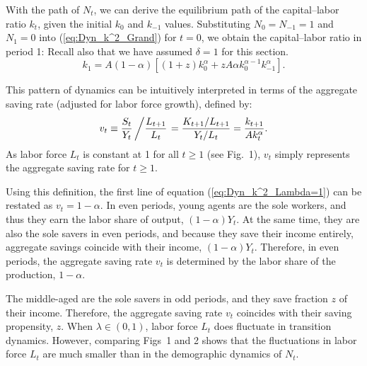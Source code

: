 \documentclass{MBE}%
\begin{document}
{With the path of $N_{t}$, we can derive the equilibrium path of the capital--labor ratio $k_{t}$,
given the initial $k_{0}$ and $k_{-1}$ values. Substituting $N_{0}=N_{-1}=1$ and $N_{1}=0$ into
(\ref{eq:Dyn_k^2_Grand}) for $t=0$, we obtain the capital--labor ratio in period 1: {Recall also
that we have assumed $\delta=1$ for this section.}
\begin{equation}
k_{1}=A(1-\alpha)\left[  (1+z)k_{0}^{\alpha}+zA\alpha k_{0}^{\alpha-1}%
k_{-1}^{\alpha}\right]  . \label{eq:Dyn_k^2_Period1}%
\end{equation}


This pattern of dynamics can be intuitively interpreted in terms of the
aggregate saving rate (adjusted for labor force growth), defined by:
\begin{equation}
v_{t}\equiv\frac{S_{t}}{Y_{t}}\left/  \frac{L_{t+1}}{L_{t}}\right.  =
\frac{K_{t+1}/L_{t+1}}{Y_{t}/L_{t}} =\frac{k_{t+1}}{A k_{t}^{\alpha}}.
\label{eq:v}%
\end{equation}
As labor force $L_{t}$ is constant at 1 for all $t\geq1$ (see Fig.~1), $v_{t}$ simply represents
the aggregate saving rate for $t\geq1$.

Using this definition, the first line of equation (\ref{eq:Dyn_k^2_Lambda=1})
can be restated as $v_{t}=1-\alpha$. In even periods, young agents are the
sole workers, and thus they earn the labor share of output, $(1-\alpha) Y_{t}%
$. At the same time, they are also the sole savers in even periods, and
because they save their income entirely, aggregate savings coincide with their
income, $(1-\alpha)Y_{t}$. Therefore, in even periods, the aggregate saving
rate $v_{t}$ is determined by the labor share of the production, $1-\alpha$.

\begin{flthem}
The middle-aged are the sole savers in odd periods, and they save fraction $z$ of their income.
Therefore, the aggregate saving rate $v_{t}$ coincides with their saving propensity, $z$. {When
$\lambda\in(0,1)$, labor force $L_{t}$ does fluctuate in transition dynamics. However, comparing
Figs~1 and 2 shows that the fluctuations in labor force $L_{t}$ are much smaller than in the
demographic dynamics of $N_{t}$.}
\end{flthem}


}
\end{document}
